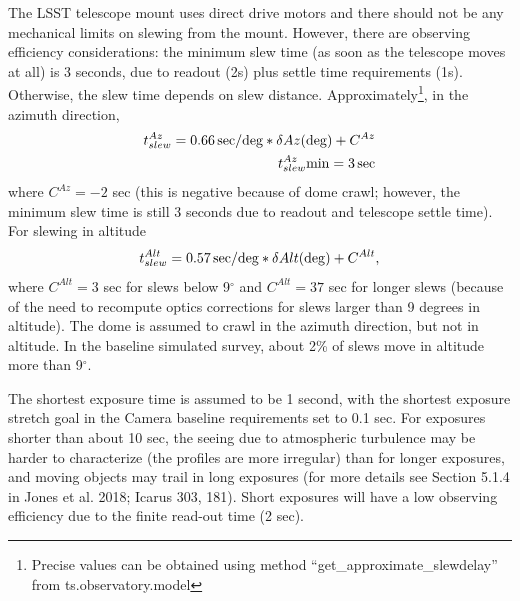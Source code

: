 \documentclass[DM,lsstdraft,toc,usenatbib]{lsstdoc}
\begin{document}
The LSST telescope mount uses direct drive motors and there should not be any mechanical limits 
on slewing from the mount.  However, there are observing efficiency considerations: the minimum
slew time (as soon as the telescope moves at all) is 3 seconds, due to readout (2s) plus settle time requirements (1s). 
Otherwise, the slew time depends on slew distance. Approximately\footnote{Precise values can be obtained using
method ``get\_approximate\_slewdelay'' from ts.observatory.model}, in the azimuth direction, 
\begin{eqnarray}
             t_{slew}^{Az} = 0.66 \, {\rm sec/deg} * \delta Az ({\rm deg}) + C^{Az} \\
             t_{slew}^{Az} {\rm min} = 3\, {\rm sec}
\end{eqnarray} 
where $C^{Az} = -2$ sec (this is negative because of dome crawl; however, the minimum
slew time is still 3 seconds due to readout and telescope settle time). For slewing in altitude
\begin{equation}
             t_{slew}^{Alt} = 0.57 \, {\rm sec/deg} * \delta Alt ({\rm deg}) + C^{Alt} ,  
\end{equation} 
where $C^{Alt} = 3$ sec for slews below 9$^\circ$ and $C^{Alt} = 37$ sec for longer slews (because 
of the need to recompute optics corrections for slews larger than 9 degrees in altitude). 
The dome is assumed to crawl in the azimuth direction, but not in altitude. 
In the baseline simulated survey, about 2\% of slews move
in altitude more than 9$^\circ$. 

The shortest exposure time is assumed to be 1 second, with the shortest exposure stretch goal in the Camera 
baseline requirements set to 0.1 sec. For exposures shorter than 
about 10 sec, the seeing due to atmospheric turbulence may be harder to characterize (the profiles are more
irregular) than for longer exposures, and moving objects may trail in long exposures (for more
details see Section 5.1.4 in Jones et al. 2018; Icarus 303, 181). Short exposures will have a low
observing efficiency due to the finite read-out time (2 sec). %
\end{document}
